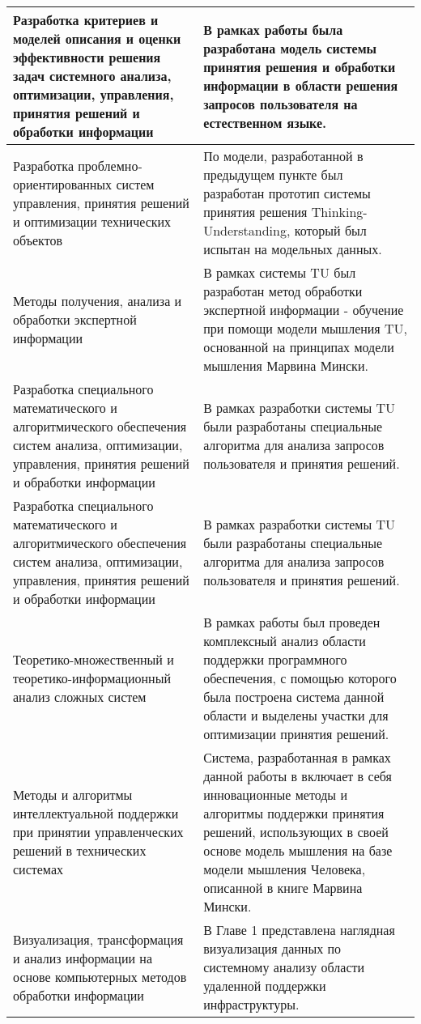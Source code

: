 \begin{longtable}{|p{7cm}|p{9cm}|}
\hline \hline
\endlastfoot
\hline
   Разработка критериев и моделей описания и оценки эффективности решения задач системного анализа, оптимизации, управления, принятия решений и обработки информации & В рамках работы была разработана модель системы принятия решения и обработки информации в области решения запросов пользователя на естественном языке. \\
   \hline
   Разработка проблемно-ориентированных систем управления, принятия решений и оптимизации технических объектов & По модели, разработанной в предыдущем пункте был разработан прототип системы принятия решения Thinking-Understanding, который был испытан на модельных данных.\\
   \hline
   Методы получения, анализа и обработки экспертной информации & В рамках системы TU был разработан метод обработки экспертной информации - обучение при помощи модели мышления TU, основанной на принципах модели мышления Марвина Мински. \\
   \hline
   Разработка специального математического и алгоритмического обеспечения систем анализа, оптимизации, управления, принятия решений и обработки информации & В рамках разработки системы TU были разработаны специальные алгоритма для анализа запросов пользователя и принятия решений.\\
  \hline 
  Разработка специального математического и алгоритмического обеспечения систем анализа, оптимизации, управления, принятия решений и обработки информации & В рамках разработки системы TU были разработаны специальные алгоритма для анализа запросов пользователя и принятия решений.\\
  \hline 
  Теоретико-множественный и теоретико-информационный анализ сложных систем & В рамках работы был проведен комплексный анализ области поддержки программного обеспечения, с помощью которого была построена система данной области и выделены участки для оптимизации принятия решений.\\
  \hline
  Методы и алгоритмы интеллектуальной поддержки при принятии управленческих решений в технических системах & Система, разработанная в рамках данной работы в включает в себя инновационные методы и алгоритмы поддержки принятия решений, использующих в своей основе модель мышления на базе модели мышления Человека, описанной в книге Марвина Мински. \\ 
  \hline
  Визуализация, трансформация и анализ информации на основе компьютерных методов обработки информации & В Главе 1 представлена наглядная визуализация данных по системному анализу области удаленной поддержки инфраструктуры. \\
  \hline	
\end{longtable}

